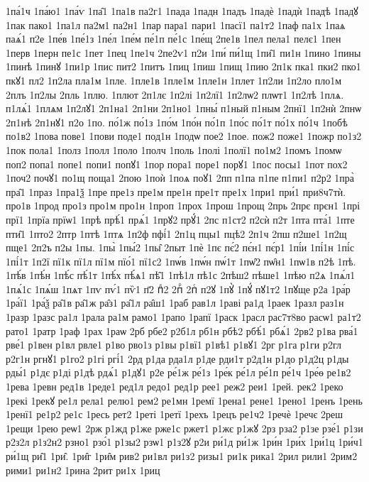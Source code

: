 {1па́1ч
1па́ю1
1па́ѵ
1па̑1
1па1в
па2г1
1пада
1падн
1падъ
1падѐ
1падѝ
1падѣ
1падꙋ
1пак
пако1
1па1л
па2м1
па2н1
1пар
пара1
пари1
1пасї1
па1т2
1паф
па1х
1паѧ
паѧ́1
п2е
1пе́в
1пе́1з
1пе́л
1пе́м
пе́1п
пе́1с
1пе́щ
2пе1в
1пел
пела1
пелє1
1пен
1перв
1перн
пе1с
1пет
1пец
1пе1ч
2пе2ѵ1
п2и
1пи́
пи́1щ
1пи̑1
пи1н
1пино
1пины
1пинѣ
1пинꙋ
1пи1р
1пис
пит2
1питъ
1пиц
1пиш
1пищ
1пию
2п1к
пка1
пки2
пко1
пкꙋ1
пл2
1п2ла
пла1м
1пле.
1пле1в
1пле1м
1пле1н
1плет
1п2ли
1п2ло
пло1м
2плъ
1п2лы
2пль
1плю.
1плют
2п1лє
1п2лі
1п2лї1
1п2лѡ2
плѡт1
1п2лѣ
1плѧ.
п1лѧ́1
1плѧм
1п2лꙋ1
2п1на1
2п1ни
2п1но1
1пны́
п1ный
п1ным
2пнї1
1п2нѝ
2пнѡ
2п1нѣ
2п1нꙋ1
п2о
1по.
по́1ж
по́1з
1по́м
1по́н
по́1п
1по́с
по́1т
по́1х
по́1ч
1побѣ
по1в2
1пова
пове1
1пови
поде1
под1н
1подѡ
пое2
1пое.
пож2
поже1
1пожр
по1з2
1пок
пола1
1полз
1полл
1поло
1полч
1поль
1полі
1полї1
по1м2
1помъ
1помѡ
поп2
попа1
попе1
попи1
попꙋ1
1пор
пора1
поре1
порꙋ1
1пос
посы1
1пот
пох2
1поч2
почꙋ1
по1щ
поща1
2пою
1поѝ
1поѧ
поꙋ1
2пп
п1па
п1пе
п1пи1
п2р2
1пра̀
пра̑1
1праз
1пра1ѯ
1пре
пре1з
пре1м
пре1н
пре1т
пре1х
1при1
при́1
при8ч7тѝ.
про1в
1прод
про1з
про1м
про1н
1проп
1прох
1прош
1прощ
2прь
2прє
прєн1
1прі
прї1
1прїа
прїѡ1
1прѣ
прѣ́1
прѧ́1
1прꙋ2
прꙋ́1
2пс
п1ст2
п2сѝ
п2т
1пта
пта́1
1пте
пти̑1
1пто2
2птр
1птѣ
1птѧ
1п2ф
пфі́1
2п1ц
пцы1
пцѣ2
2п1ч
2пш
п2ше1
1п2щ
пще1
2п2ъ
п2ы
1пы.
1пы̀
1пы́2
1пы̑
2пыт
1пѐ
1пє
пє́2
пє́н1
пє́р1
1пі́и
1пі́1н
1пі́с
1пі́1т
1п2ї
пї1к
пї1л
пї1м
пїо́1
пї1с2
1пѡ́в
1пѡ́н
пѡ́1т
1пѡ̑2
пѡ̑н1
1пѡ1в
п2ѣ
1пѣ.
1пѣ́в
1пѣ́н
1пѣ́с
пѣ́1т
1пѣ́х
пѣ́ѧ1
пѣ̑1
1пѣ1л
пѣ1с
2пѣш2
пѣше1
1пѣю
п2ѧ
1пѧ́л1
1пѧ́1с
1пѧ́ш
1пѧт
1пѵ
пѵ́1
пѷ1
п҃2
пⷣ2
2пⷬ
2пⷭ
п2ꙋ
1пꙋ̀
1пꙋ́
пꙋ1т2
1пꙋще
р2а
1ра́р
1ра́ї1
1ра́ѯ
ра̑1в
ра̑1ж
ра̑з1
ра̑1л
ра̑ш1
1раб
рав1л
1раві
ра1д
1раек
1разл
раз1н
1разр
1разс
ра1л
1рала
ра1м
рамо1
1рапо
1рапї
1раск
1расл
рас7т8во
расѡ1
ра1т2
рато1
1ратр
1раф
1рах
1раѡ
2рб
рбе2
р2б1л
рб1н
рбѣ2
рбѣ́1
рбѧ́1
2рв2
р1ва
рва́1
рве́1
р1вен
р1вл
рвле1
р1во
рво1з
р1вы
р1вї1
р1вѣ1
р1вꙋ1
2рг
р1га
р1ги
р2гл
р2г1н
ргнꙋ1
р1го2
р1гі
ргі́1
2рд
р1да
рда1л
р1де
рди1т
р2д1н
р1до
р1д2ц
р1ды
рды́1
р1дє
р1ді
р1дѣ
рдѧ́1
р1дꙋ1
р2е
ре́1ж
ре́1з
1ре́к
ре́1л
ре́1п
ре́1ч
1ре́ѳ
ре1в2
1рева
1ревн
ред1в
1реде1
ред1л
редо1
ред1р
рее1
реж2
реи1
1рей.
рек2
1реко
1рекі
1рекꙋ
ре1л
рела1
релю1
рем2
ре1мн
1ремї
1рена1
рене1
1рено1
1ренъ
1рень
1ренї1
ре1р2
ре1с
1ресь
рет2
1реті
1ретї
1рехъ
1рецъ
ре1ч2
1речѐ
1речє
2реш
1рещи
1рею
реѡ1
2рж
р1жд
р1же
рже1с
ржет1
р1жє
р1жꙋ
2рз
рза2
р1зе
рзе́1
р1зи
р2з2л
р1з2н2
рзно1
рзо́1
р1зы2
рзѡ1
р1з2ꙋ
р2и
ри́1д
ри́1ж
1ри́н
1ри́х
1ри́1ц
1ри́ч1
ри́1щ
ри̑1
1ри̑.
1ри̑г
1ри̑м
рив2
ри1вл
ри1з2
ризы1
ри1к
рика1
2рил
рили1
2рим2
рими1
ри1н2
1рина
2рит
ри1х
1риц
}
